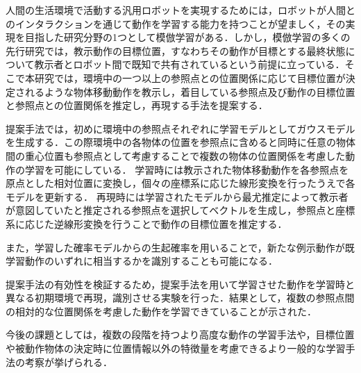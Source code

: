 ﻿人間の生活環境で活動する汎用ロボットを実現するためには，ロボットが人間とのインタラクションを通じて動作を学習する能力を持つことが望ましく，その実現を目指した研究分野の1つとして模倣学習がある．しかし，模倣学習の多くの先行研究では，教示動作の目標位置，すなわちその動作が目標とする最終状態について教示者とロボット間で既知で共有されているという前提に立っている．そこで本研究では，環境中の一つ以上の参照点との位置関係に応じて目標位置が決定されるような物体移動動作を教示し，着目している参照点及び動作の目標位置と参照点との位置関係を推定し，再現する手法を提案する．

提案手法では，初めに環境中の参照点それぞれに学習モデルとしてガウスモデルを生成する．この際環境中の各物体の位置を参照点に含めると同時に任意の物体間の重心位置も参照点として考慮することで複数の物体の位置関係を考慮した動作の学習を可能にしている．
学習時には教示された物体移動動作を各参照点を原点とした相対位置に変換し，個々の座標系に応じた線形変換を行ったうえで各モデルを更新する．
再現時には学習されたモデルから最尤推定によって教示者が意図していたと推定される参照点を選択してベクトルを生成し，参照点と座標系に応じた逆線形変換を行うことで動作の目標位置を推定する．

また，学習した確率モデルからの生起確率を用いることで，新たな例示動作が既学習動作のいずれに相当するかを識別することも可能になる．

提案手法の有効性を検証するため，提案手法を用いて学習させた動作を学習時と異なる初期環境で再現，識別させる実験を行った．結果として，複数の参照点間の相対的な位置関係を考慮した動作を学習できていることが示された．

今後の課題としては，複数の段階を持つより高度な動作の学習手法や，目標位置や被動作物体の決定時に位置情報以外の特徴量を考慮できるより一般的な学習手法の考察が挙げられる．